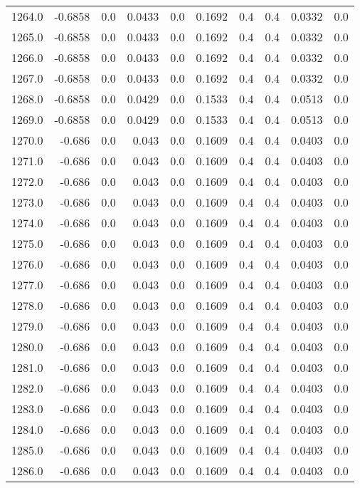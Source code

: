 \begin{longtable}{lrrrrrrrrr}
1264.0 & -0.6858 & 0.0 & 0.0433 & 0.0 & 0.1692 & 0.4 & 0.4 & 0.0332 & 0.0 \\
1265.0 & -0.6858 & 0.0 & 0.0433 & 0.0 & 0.1692 & 0.4 & 0.4 & 0.0332 & 0.0 \\
1266.0 & -0.6858 & 0.0 & 0.0433 & 0.0 & 0.1692 & 0.4 & 0.4 & 0.0332 & 0.0 \\
1267.0 & -0.6858 & 0.0 & 0.0433 & 0.0 & 0.1692 & 0.4 & 0.4 & 0.0332 & 0.0 \\
1268.0 & -0.6858 & 0.0 & 0.0429 & 0.0 & 0.1533 & 0.4 & 0.4 & 0.0513 & 0.0 \\
1269.0 & -0.6858 & 0.0 & 0.0429 & 0.0 & 0.1533 & 0.4 & 0.4 & 0.0513 & 0.0 \\
1270.0 & -0.686 & 0.0 & 0.043 & 0.0 & 0.1609 & 0.4 & 0.4 & 0.0403 & 0.0 \\
1271.0 & -0.686 & 0.0 & 0.043 & 0.0 & 0.1609 & 0.4 & 0.4 & 0.0403 & 0.0 \\
1272.0 & -0.686 & 0.0 & 0.043 & 0.0 & 0.1609 & 0.4 & 0.4 & 0.0403 & 0.0 \\
1273.0 & -0.686 & 0.0 & 0.043 & 0.0 & 0.1609 & 0.4 & 0.4 & 0.0403 & 0.0 \\
1274.0 & -0.686 & 0.0 & 0.043 & 0.0 & 0.1609 & 0.4 & 0.4 & 0.0403 & 0.0 \\
1275.0 & -0.686 & 0.0 & 0.043 & 0.0 & 0.1609 & 0.4 & 0.4 & 0.0403 & 0.0 \\
1276.0 & -0.686 & 0.0 & 0.043 & 0.0 & 0.1609 & 0.4 & 0.4 & 0.0403 & 0.0 \\
1277.0 & -0.686 & 0.0 & 0.043 & 0.0 & 0.1609 & 0.4 & 0.4 & 0.0403 & 0.0 \\
1278.0 & -0.686 & 0.0 & 0.043 & 0.0 & 0.1609 & 0.4 & 0.4 & 0.0403 & 0.0 \\
1279.0 & -0.686 & 0.0 & 0.043 & 0.0 & 0.1609 & 0.4 & 0.4 & 0.0403 & 0.0 \\
1280.0 & -0.686 & 0.0 & 0.043 & 0.0 & 0.1609 & 0.4 & 0.4 & 0.0403 & 0.0 \\
1281.0 & -0.686 & 0.0 & 0.043 & 0.0 & 0.1609 & 0.4 & 0.4 & 0.0403 & 0.0 \\
1282.0 & -0.686 & 0.0 & 0.043 & 0.0 & 0.1609 & 0.4 & 0.4 & 0.0403 & 0.0 \\
1283.0 & -0.686 & 0.0 & 0.043 & 0.0 & 0.1609 & 0.4 & 0.4 & 0.0403 & 0.0 \\
1284.0 & -0.686 & 0.0 & 0.043 & 0.0 & 0.1609 & 0.4 & 0.4 & 0.0403 & 0.0 \\
1285.0 & -0.686 & 0.0 & 0.043 & 0.0 & 0.1609 & 0.4 & 0.4 & 0.0403 & 0.0 \\
1286.0 & -0.686 & 0.0 & 0.043 & 0.0 & 0.1609 & 0.4 & 0.4 & 0.0403 & 0.0 \\

\end{longtable}
